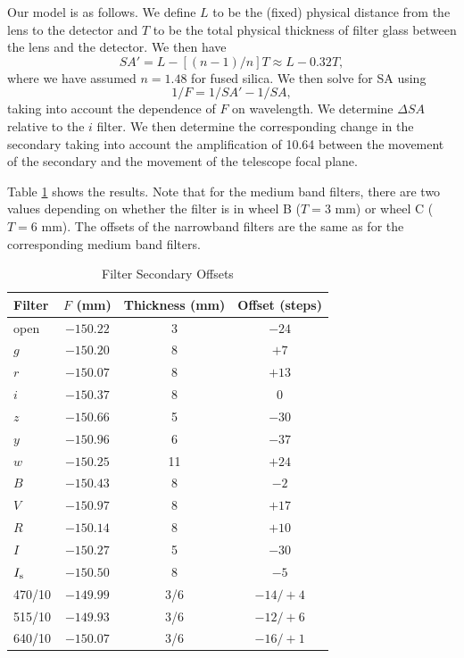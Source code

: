 Our model is as follows. We define $L$ to be the (fixed) physical distance from the lens to the detector and $T$ to be the total physical thickness of filter glass between the lens and the detector. We then have
$$
SA' = L - [(n - 1) / n] T \approx L - 0.32 T,
$$
where we have assumed $n = 1.48$ for fused silica. We then solve for SA using
$$
1/F = 1/SA' - 1/SA,
$$
taking into account the dependence of $F$ on wavelength. We determine $\Delta SA$ relative to the $i$ filter. We then determine the corresponding change in the secondary taking into account the amplification of 10.64 between the movement of the secondary and the movement of the telescope focal plane.

Table \ref{table:filter-secondary-offsets} shows the results. Note that for the medium band filters, there are two values depending on whether the filter is in wheel B ($T = 3$ mm) or wheel C ($T = 6$ mm). The offsets of the narrowband filters are the same as for the corresponding medium band filters.

\begin{table}
\begin{center}
\caption{Filter Secondary Offsets}
\label{table:filter-secondary-offsets}
\medskip
\begin{tabular}{lccc}
\hline
Filter&$F$ (mm)&Thickness (mm)&Offset (steps)\\
\hline
open		&$-150.22$		&\phantom{0}3		&\phantom{}$-24$\\
$g$		&$-150.20$		&\phantom{0}8		&\phantom{0}$+7$\\
$r$		&$-150.07$		&\phantom{0}8		&\phantom{}$+13$\\
$i$			&$-150.37$		&\phantom{0}8		&\phantom{+0}$0$\\
$z$		&$-150.66$		&\phantom{0}5		&\phantom{}$-30$\\
$y$		&$-150.96$		&\phantom{0}6		&\phantom{}$-37$\\
$w$		&$-150.25$		&\phantom{}11		&\phantom{}$+24$\\
$B$		&$-150.43$		&\phantom{0}8		&\phantom{0}$-2$\\
$V$		&$-150.97$		&\phantom{0}8		&\phantom{}$+17$\\
$R$		&$-150.14$		&\phantom{0}8		&\phantom{}$+10$\\
$I$		&$-150.27$		&\phantom{0}5		&\phantom{}$-30$\\
$\mbox{$I_\mathrm{s}$}$		&$-150.50$		&\phantom{0}8		&\phantom{0}$-5$\\
470/10	&$-149.99$		&\phantom{}3/6		&\phantom{}$-14/+4$\\
515/10	&$-149.93$		&\phantom{}3/6		&\phantom{}$-12/+6$\\
640/10	&$-150.07$		&\phantom{}3/6		&\phantom{}$-16/+1$\\
\hline
\end{tabular}
\end{center}
\end{table}

